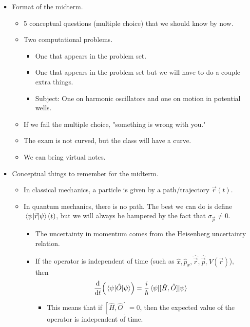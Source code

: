 \documentclass[../notes.tex]{subfiles}
\begin{document}
\begin{itemize}
    \item {}Format of the midterm.
    \begin{itemize}
        \item 5 conceptual questions (multiple choice) that we should know by now.
        \item Two computational problems.
        \begin{itemize}
            \item One that appears in the problem set.
            \item One that appears in the problem set but we will have to do a couple extra things.
            \item Subject: One on harmonic oscillators and one on motion in potential wells.
        \end{itemize}
        \item If we fail the multiple choice, "something is wrong with you."
        \item The exam is not curved, but the class will have a curve.
        \item We can bring virtual notes.
    \end{itemize}
    \item Conceptual things to remember for the midterm.
    \begin{itemize}
        \item In classical mechanics, a particle is given by a path/trajectory $\vec{r}(t)$.
        \item In quantum mechanics, there is no path. The best we can do is define $\ev{\vec{r}}{\psi}(t)$, but we will always be hampered by the fact that $\sigma_{\vec{p}}\neq 0$.
        \begin{itemize}
            \item The uncertainty in momentum comes from the Heisenberg uncertainty relation.
            \item If the operator is independent of time (such as $\hat{x},\hat{p}_x,\hat{\vec{r}},\hat{\vec{p}},V(\vec{r})$), then
            \begin{equation*}
                \dv{t}(\ev{\hat{O}}{\psi}) = \frac{i}{\hbar}\ev{[\hat{H},\hat{O}]}{\psi}
            \end{equation*}
            \begin{itemize}
                \item This means that if $[\hat{H},\hat{O}]=0$, then the expected value of the operator is independent of time.

\end{itemize}
\end{itemize}
\end{itemize}
\end{itemize}
\end{document}
